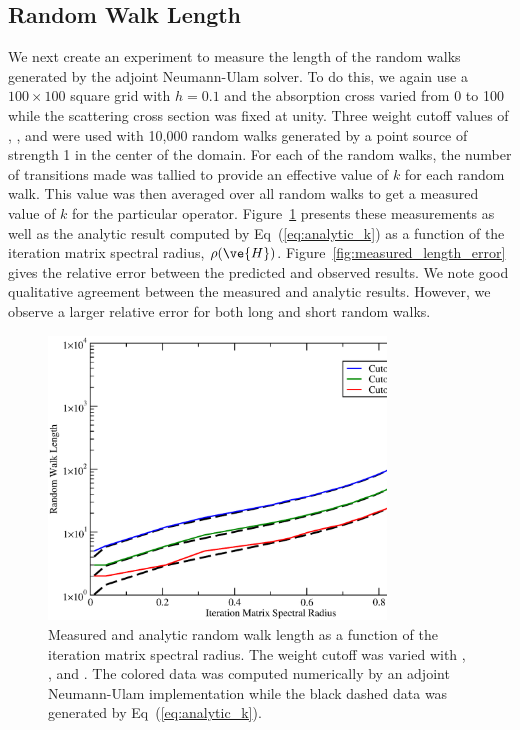 \documentclass[preprint,11pt]{elsarticle}
\begin{document}
\subsection{Random Walk Length}
\label{subsec:walk_length}

We next create an experiment to measure the length of the random walks
generated by the adjoint Neumann-Ulam solver. To do this, we again use a $100
\times 100$ square grid with $h=0.1$ and the absorption cross varied from 0 to
100 while the scattering cross section was fixed at unity. Three weight cutoff
values of , , and  were used with 10,000 random
walks generated by a point source of strength 1 in the center of the
domain. For each of the random walks, the number of transitions made was
tallied to provide an effective value of $k$ for each random walk. This value
was then averaged over all random walks to get a measured value of $k$ for the
particular operator. Figure~\ref{fig:measured_length} presents
these measurements as well as the analytic result computed by
Eq~(\ref{eq:analytic_k}) as a function of the iteration matrix spectral
radius, $\rho(\ve{H})$. Figure~\ref{fig:measured_length_error} gives
the relative error between the predicted and observed results. We note good
qualitative agreement between the measured and analytic results. However, we
observe a larger relative error for both long and short random walks.
\begin{figure}[ht!]
  \begin{center}
    \includegraphics[width=0.8\textwidth]{random_walk_length.eps}
  \end{center}
  \caption{Measured and analytic random walk length as a function of the
    iteration matrix spectral radius. The weight cutoff was varied with
    , , and . The colored data was computed
    numerically by an adjoint Neumann-Ulam implementation while the black
    dashed data was generated by Eq~(\ref{eq:analytic_k}).}
  \label{fig:measured_length}
\end{figure}
\end{document}
